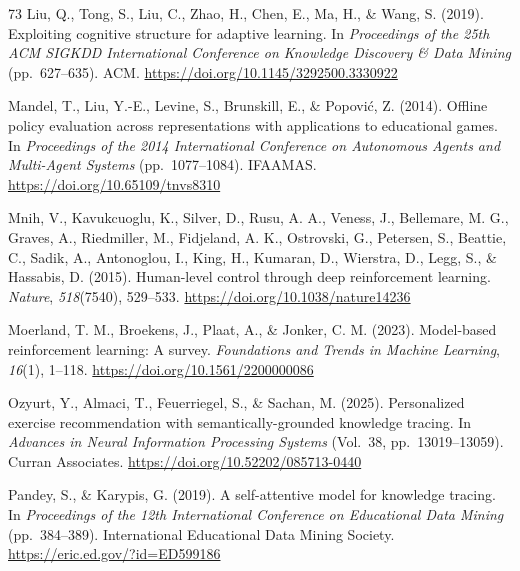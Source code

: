 \documentclass[a4paper,preprint,12pt,authoryear]{elsarticle}
\begin{document}
\begin{thebibliography}{73}
Liu, Q., Tong, S., Liu, C., Zhao, H., Chen, E., Ma, H., \& Wang, S. (2019). Exploiting cognitive structure for adaptive learning. In \textit{Proceedings of the 25th ACM SIGKDD International Conference on Knowledge Discovery \& Data Mining} (pp.~627--635). ACM. \url{https://doi.org/10.1145/3292500.3330922}

Mandel, T., Liu, Y.-E., Levine, S., Brunskill, E., \& Popović, Z. (2014). Offline policy evaluation across representations with applications to educational games. In \textit{Proceedings of the 2014 International Conference on Autonomous Agents and Multi-Agent Systems} (pp.~1077--1084). IFAAMAS. \url{https://doi.org/10.65109/tnvs8310}

Mnih, V., Kavukcuoglu, K., Silver, D., Rusu, A. A., Veness, J., Bellemare, M. G., Graves, A., Riedmiller, M., Fidjeland, A. K., Ostrovski, G., Petersen, S., Beattie, C., Sadik, A., Antonoglou, I., King, H., Kumaran, D., Wierstra, D., Legg, S., \& Hassabis, D. (2015). Human-level control through deep reinforcement learning. \textit{Nature}, \textit{518}(7540), 529--533. \url{https://doi.org/10.1038/nature14236}

Moerland, T. M., Broekens, J., Plaat, A., \& Jonker, C. M. (2023). Model-based reinforcement learning: A survey. \textit{Foundations and Trends in Machine Learning}, \textit{16}(1), 1--118. \url{https://doi.org/10.1561/2200000086}

Ozyurt, Y., Almaci, T., Feuerriegel, S., \& Sachan, M. (2025). Personalized exercise recommendation with semantically-grounded knowledge tracing. In \textit{Advances in Neural Information Processing Systems} (Vol.~38, pp.~13019--13059). Curran Associates. \url{https://doi.org/10.52202/085713-0440}

Pandey, S., \& Karypis, G. (2019). A self-attentive model for knowledge tracing. In \textit{Proceedings of the 12th International Conference on Educational Data Mining} (pp.~384--389). International Educational Data Mining Society. \url{https://eric.ed.gov/?id=ED599186}


\end{thebibliography}
\end{document}
